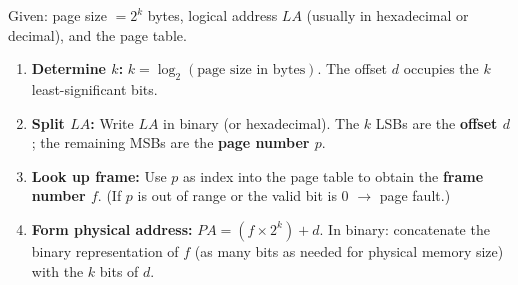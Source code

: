 \documentclass[11pt]{article}
\newcommand{\cle}[1]{{\popxbold\color{popdark}#1}}
\begin{document}
\begin{methode}
Given: page size $= 2^k$ bytes, logical address $LA$ (usually in hexadecimal or decimal), and the page table.
\begin{enumerate}
    \item \textbf{Determine $k$:} $k = \log_2(\text{page size in bytes})$. The offset $d$ occupies the $k$ least-significant bits.
    \item \textbf{Split $LA$:} Write $LA$ in binary (or hexadecimal). The $k$ LSBs are the \textbf{offset $d$}; the remaining MSBs are the \textbf{page number $p$}.
    \item \textbf{Look up frame:} Use $p$ as index into the page table to obtain the \textbf{frame number $f$}. (If $p$ is out of range or the valid bit is 0 $\to$ \cle{page fault}.)
    \item \textbf{Form physical address:} $PA = (f \times 2^k) + d$. In binary: concatenate the binary representation of $f$ (as many bits as needed for physical memory size) with the $k$ bits of $d$.
\end{enumerate}
\end{methode}
\end{document}
